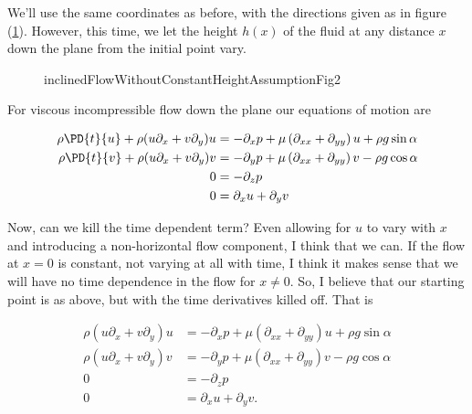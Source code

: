 We'll use the same coordinates as before, with the directions given as in figure (\ref{fig:inclinedFlowWithoutConstantHeightAssumption:inclinedFlowWithoutConstantHeightAssumptionFig2}).  However, this time, we let the height $h(x)$ of the fluid at any distance $x$ down the plane from the initial point vary.

\begin{figure}[htp]
   \centering
   \def\svgwidth{0.7\columnwidth}
   
   \caption{inclinedFlowWithoutConstantHeightAssumptionFig2}
\label{fig:inclinedFlowWithoutConstantHeightAssumption:inclinedFlowWithoutConstantHeightAssumptionFig2}
\end{figure}

For viscous incompressible flow down the plane our equations of motion are

\begin{align}\label{eqn:inclinedFlowWithoutConstantHeightAssumption:20}
\rho \PD{t}{u} + \rho (u \partial_x + v \partial_y) u &= -\partial_x p + \mu \left(\partial_{xx} + \partial_{yy}\right) u + \rho g \sin\alpha \\
\rho \PD{t}{v} + \rho (u \partial_x + v \partial_y) v &= -\partial_y p + \mu \left(\partial_{xx} + \partial_{yy}\right) v - \rho g \cos\alpha \\
0 &= -\partial_z p \\
0 &= \partial_x u + \partial_y v
\end{align}

Now, can we kill the time dependent term?  Even allowing for $u$ to vary with $x$ and introducing a non-horizontal flow component, I think that we can.  If the flow at $x = 0$ is constant, not varying at all with time, I think it makes sense that we will have no time dependence in the flow for $x \ne 0$.  So, I believe that our starting point is as above, but with the time derivatives killed off.  That is

\begin{align}\label{eqn:inclinedFlowWithoutConstantHeightAssumption:40}
\rho (u \partial_x + v \partial_y) u &= -\partial_x p + \mu \left(\partial_{xx} + \partial_{yy}\right) u + \rho g \sin\alpha \\
\rho (u \partial_x + v \partial_y) v &= -\partial_y p + \mu \left(\partial_{xx} + \partial_{yy}\right) v - \rho g \cos\alpha \\
0 &= -\partial_z p \\
0 &= \partial_x u + \partial_y v.
\end{align}

